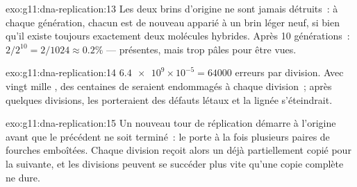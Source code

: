 \begin{solution}{exo:g11:dna-replication:13}
Les deux brins d'origine ne sont jamais détruits~: à chaque génération,
chacun est de nouveau apparié à un brin léger neuf, si bien qu'il
existe toujours exactement deux molécules hybrides. Après 10
générations~: $2/2^{10} = 2/1024
\approx 0.2\%$ --- présentes, mais trop pâles pour être vues.
\end{solution}

\begin{solution}{exo:g11:dna-replication:14}
$\num{6.4e9} \times 10^{-5} = \num{64000}$ erreurs par division. Avec
vingt mille , des centaines de  seraient endommagés à chaque
division~; après quelques divisions, les  porteraient des
défauts létaux et la lignée s'éteindrait.
\end{solution}

\begin{solution}{exo:g11:dna-replication:15}
Un nouveau tour de réplication démarre à l'origine avant que le
précédent ne soit terminé~: le  porte à la fois plusieurs
paires de fourches emboîtées. Chaque division reçoit alors un
 déjà partiellement copié pour la suivante, et les divisions
peuvent se succéder plus vite qu'une copie complète ne dure.
\end{solution}

